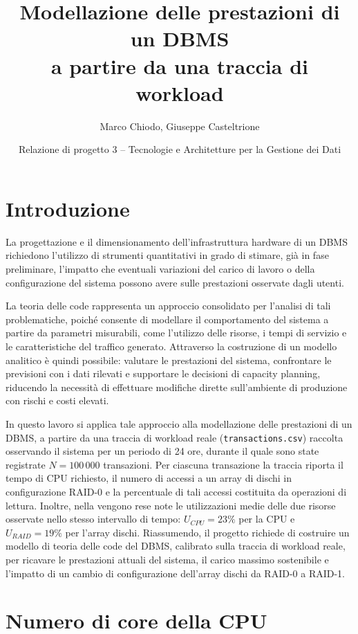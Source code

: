 \documentclass[11pt,a4paper]{article}
\title{Modellazione delle prestazioni di un DBMS\\ a partire da una traccia di workload}
\author{Marco Chiodo, Giuseppe Casteltrione}
\date{Relazione di progetto 3 -- Tecnologie e Architetture per la Gestione dei Dati}
\begin{document}
\maketitle

\section{Introduzione}

La progettazione e il dimensionamento dell'infrastruttura hardware di un DBMS richiedono
l'utilizzo di strumenti quantitativi in grado di stimare, già in fase preliminare, l'impatto che
eventuali variazioni del carico di lavoro o della configurazione del sistema possono avere sulle
prestazioni osservate dagli utenti.

La teoria delle code rappresenta un approccio consolidato per l'analisi di tali problematiche,
poiché consente di modellare il comportamento del sistema a partire da parametri misurabili,
come l'utilizzo delle risorse, i tempi di servizio e le caratteristiche del traffico generato. Attraverso
la costruzione di un modello analitico è quindi possibile: valutare le prestazioni del sistema, confrontare
le previsioni con i dati rilevati e supportare le decisioni di capacity planning, riducendo la necessità
di effettuare modifiche dirette sull'ambiente di produzione con rischi e costi elevati.

In questo lavoro si applica tale approccio alla modellazione delle prestazioni di un DBMS, a partire
da una traccia di workload reale (\texttt{transactions.csv}) raccolta osservando il sistema per un
periodo di 24 ore, durante il quale sono state registrate $N=100\,000$ transazioni. Per ciascuna
transazione la traccia riporta il tempo di CPU richiesto, il numero di accessi a un array di dischi
in configurazione RAID-0 e la percentuale di tali accessi costituita da operazioni di lettura.
Inoltre, nella vengono rese note le utilizzazioni medie delle due risorse osservate nello
stesso intervallo di tempo: $U_{CPU}=23\%$ per la CPU e $U_{RAID}=19\%$ per l'array dischi. Riassumendo, il
progetto richiede di costruire un modello di teoria delle code del DBMS, calibrato sulla traccia di
workload reale, per ricavare le prestazioni attuali del sistema, il carico massimo sostenibile e
l'impatto di un cambio di configurazione dell'array dischi da RAID-0 a RAID-1.

\section{Numero di core della CPU}
\end{document}
